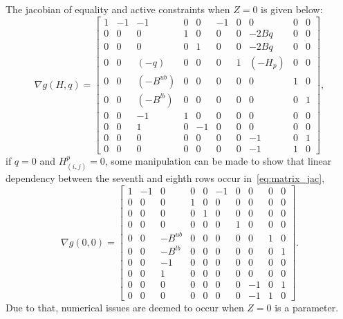 The jacobian of equality and active constraints when $Z=0$ is given below:
\begin{equation}\label{eq:matrix_jac}
    \nabla g(H,q) =\begin{bmatrix} 1& -1& -1&0&0& -1&0&0&0&0
        \\0&0&0& 1&0&0&0& -2Bq&0&0
        \\0&0&0&0& 1&0&0& -2Bq&0&0
        \\0&0& (-q)&0&0&0& 1& (-H_p)&0&0
        \\0&0& (-B^{ub})&0&0&0&0&0& 1&0
        \\0&0& (-B^{lb})&0&0&0&0&0&0& 1
        \\0&0& -1& 1&0&0&0&0&0&0
        \\0&0& 1&0& -1&0&0&0&0&0
        \\0&0&0&0&0&0&0& -1&0& 1
        \\0&0&0&0&0&0&0& -1& 1&0
    \end{bmatrix},
\end{equation}
if $q = 0$ and $H^p_{(i,j)}=0$, some manipulation can be made to show that linear dependency between the seventh and eighth rows occur in~\eqref{eq:matrix_jac},
\begin{equation}\label{eq:matrix_jac_q0}
    \nabla g(0,0) = \begin{bmatrix} 1& -1& 0&0&0& -1&0&0&0&0
        \\0&0&0& 1&0&0&0& 0&0&0
        \\0&0&0&0& 1&0&0& 0&0&0
        \\0&0& 0&0&0&0& 1& 0&0&0
        \\0&0& -B^{ub}&0&0&0&0&0& 1&0
        \\0&0& -B^{lb}&0&0&0&0&0&0& 1
        \\0&0& -1& 0&0&0&0&0&0&0
        \\0&0& 1&0& 0&0&0&0&0&0
        \\0&0&0&0&0&0&0& -1&0& 1
        \\0&0&0&0&0&0&0& -1& 1&0
    \end{bmatrix}.
\end{equation}
Due to that, numerical issues are deemed to occur when $Z=0$ is a parameter.


